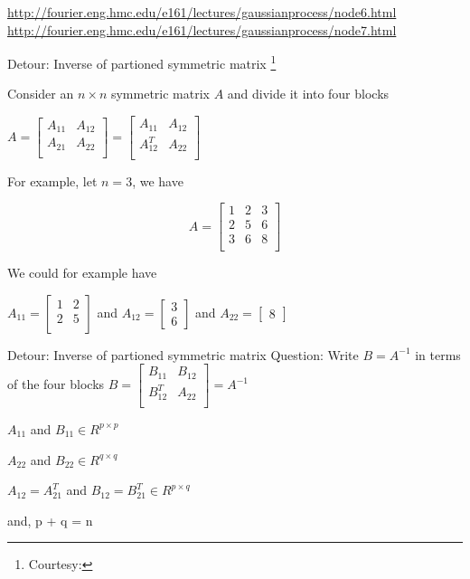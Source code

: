 \documentclass{beamer}
\begin{document}
\urldef\nodeSix\url{http://fourier.eng.hmc.edu/e161/lectures/gaussianprocess/node6.html}
\urldef\nodeSeven\url{http://fourier.eng.hmc.edu/e161/lectures/gaussianprocess/node7.html}


\begin{frame}{Detour: Inverse of partioned symmetric matrix \footnote{Courtesy: \nodeSix}}

Consider an $n\times n$ symmetric matrix $A$ and divide it into four blocks

$
A = \begin{bmatrix}
	A_{11} & A_{12}\\
	A_{21} & A_{22} \\
\end{bmatrix} =  \begin{bmatrix}
A_{11} & A_{12}\\
A_{12}^T & A_{22} \\
\end{bmatrix}
$

For example, let $n=3$, we have

$$
A =  \begin{bmatrix}
	1 & 2 & 3\\
	2 & 5 & 6 \\
	3 & 6 & 8 \\
	
\end{bmatrix}
$$

We could for example have 

$A_{11} = \begin{bmatrix}
1 & 2 \\
2 & 5 \\
\end{bmatrix}$ and $A_{12} = \begin{bmatrix}
3 \\ 6
\end{bmatrix}
$ and $A_{22} = \begin{bmatrix}
8
\end{bmatrix}$
\end{frame}

\begin{frame}{Detour: Inverse of partioned symmetric matrix}
Question: Write $B = A^{-1}$ in terms of the four blocks
$
B = \begin{bmatrix}
	B_{11} & B_{12}\\
	B_{12}^T & A_{22} \\
\end{bmatrix}
= A^{-1}$

$A_{11}$ and $B_{11} \in R^{p\times p}$ 

$A_{22}$ and $B_{22} \in R^{q\times q}$

$A_{12} = A_{21}^T$ and $B_{12} = B_{21}^T \in R^{p\times q}$

and, p + q = n 
 
\end{frame}
\end{document}

